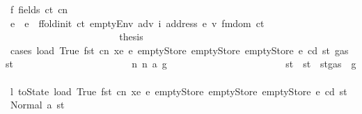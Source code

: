 \begin{isabellebody}
\ f{}{\isacharcolon}{\kern0pt}\ {\isacharparenleft}{\kern0pt}fields\ ct\ cn\ {\isacharunderscore}{\kern0pt}{\isacharparenright}{\kern0pt}\isanewline
\ \ \ \ \ \ \ \ \ \ \ \ \ \ \ \ \ \ \ \ \isamarkupfalse%
\ e{\isacharprime}{\kern0pt}\ \ {\isachardoublequoteopen}e{\isacharprime}{\kern0pt}\ {\isacharequal}{\kern0pt}\ ffold{\isacharunderscore}{\kern0pt}init\ ct\ {\isacharparenleft}{\kern0pt}emptyEnv\ adv\ i\ {\isacharparenleft}{\kern0pt}address\ e{\isacharparenright}{\kern0pt}\ v{\isacharparenright}{\kern0pt}\ {\isacharparenleft}{\kern0pt}fmdom\ ct{\isacharparenright}{\kern0pt}{\isachardoublequoteclose}\isanewline
\ \ \ \ \ \ \ \ \ \ \ \ \ \ \ \ \ \ \ \ \isamarkupfalse%
\ \isamarkupfalse%
\ {\isacharquery}{\kern0pt}thesis\isanewline
\ \ \ \ \ \ \ \ \ \ \ \ \ \ \ \ \ \ \ \ \isamarkupfalse%
\ {\isacharparenleft}{\kern0pt}cases\ {\isachardoublequoteopen}load\ True\ {\isacharparenleft}{\kern0pt}fst\ cn{\isacharparenright}{\kern0pt}\ xe\ e{\isacharprime}{\kern0pt}\ emptyStore\ emptyStore\ emptyStore\ e\ cd\ st{\isacharprime}{\kern0pt}{\isacharprime}{\kern0pt}\ {\isacharparenleft}{\kern0pt}gas\ st{\isacharprime}{\kern0pt}{\isacharprime}{\kern0pt}{\isacharparenright}{\kern0pt}{\isachardoublequoteclose}{\isacharparenright}{\kern0pt}\isanewline
\ \ \ \ \ \ \ \ \ \ \ \ \ \ \ \ \ \ \ \ \ \ \isamarkupfalse%
\ n{}{\isacharcolon}{\kern0pt}\ {\isacharparenleft}{\kern0pt}n\ a\ g{\isacharprime}{\kern0pt}{\isacharprime}{\kern0pt}{\isacharparenright}{\kern0pt}\isanewline
\ \ \ \ \ \ \ \ \ \ \ \ \ \ \ \ \ \ \ \ \ \ \isamarkupfalse%
\ st{\isacharprime}{\kern0pt}{\isacharprime}{\kern0pt}{\isacharprime}{\kern0pt}\ \ {\isachardoublequoteopen}st{\isacharprime}{\kern0pt}{\isacharprime}{\kern0pt}{\isacharprime}{\kern0pt}\ {\isacharequal}{\kern0pt}\ st{\isacharprime}{\kern0pt}{\isacharprime}{\kern0pt}{\isasymlparr}gas\ {\isacharcolon}{\kern0pt}{\isacharequal}{\kern0pt}\ g{\isacharprime}{\kern0pt}{\isacharprime}{\kern0pt}{\isasymrparr}{\isachardoublequoteclose}\isanewline
\ \ \ \ \ \ \ \ \ \ \ \ \ \ \ \ \ \ \ \ \ \ \isamarkupfalse%
\ \isamarkupfalse%
\ l{}{\isacharcolon}{\kern0pt}\ {\isachardoublequoteopen}toState\ {\isacharparenleft}{\kern0pt}load\ True\ {\isacharparenleft}{\kern0pt}fst\ cn{\isacharparenright}{\kern0pt}\ xe\ e{\isacharprime}{\kern0pt}\ emptyStore\ emptyStore\ emptyStore\ e\ cd{\isacharparenright}{\kern0pt}\ st{\isacharprime}{\kern0pt}{\isacharprime}{\kern0pt}\ {\isacharequal}{\kern0pt}\ Normal\ {\isacharparenleft}{\kern0pt}a{\isacharcomma}{\kern0pt}\ st{\isacharprime}{\kern0pt}{\isacharprime}{\kern0pt}{\isacharprime}{\kern0pt}{\isacharparenright}{\kern0pt}{\isachardoublequoteclose}\ \isamarkupfalse%

\end{isabellebody}
